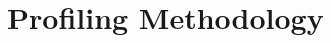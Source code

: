 \section{Profiling Methodology}
\label{app:meth}


\begin{comment}
Plenty of things can go wrong when \alts{profiling, measuring \alts{execution, run}
times}.  These are the ones I was aware of and tried to account for while doing
measurements for this \article.
\begin{itemize}
   \item \emph{CPU frequency scaling and boosting}.
      CPU frequencies are usually dynamic these days and automatically adjusted based on
      at least workload and temperature.  This should be disabled when measuring execution
      times.  I used the cpupower(1) program.
      \begin{verbatim}
         # cpupower frequency-set -g performance
         $ ./benchmark
         # cpupower frequency-set -g ondemand
      \end{verbatim}
   \item \emph{Interrupts and context switches.}  The process being timed has to share
      resources with other processes and the operating system.  A context switch will not
      only increase wall time, it will also increase cycles because of TLB flushes and
      cache evictions. %

      Processor shielding, %
      taking the minimum of several measurements, and assigning a very high priority can
      \alts{help here, mitigate these problems}.
      \begin{verbatim}
         # chrt -f 99 \time -v ./program
      \end{verbatim}
   \item \emph{CPU jumping.}
      CPU pinning (setting processor/thread affinity) may help. %
   \item \emph{Cache warmth.}
      When comparing different solutions on the same data set, later ones may benefit from 
      data having been loaded into cache already.  Checking whether swapping the order of
      measurements changes the results is a good idea.
\end{itemize}
These effects may \alts{add noise to, pollute} the results, render them irreproducible, or
invalidate them completely.


\end{comment}
